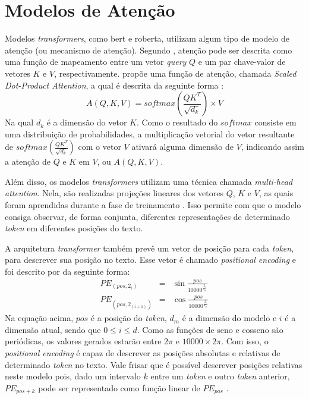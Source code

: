 \section{Modelos de Atenção}
Modelos \textit{transformers}, como \gls{bert} e \gls{roberta}, utilizam algum tipo de modelo de atenção (ou mecanismo de atenção). Segundo \textcite{Vaswani2017AttentionIA}, atenção pode ser descrita como uma função de mapeamento entre um vetor \textit{query} $Q$ e um par chave-valor de vetores $K$ e $V$, respectivamente. \textcite{Vaswani2017AttentionIA} propõe uma função de atenção, chamada \textit{Scaled Dot-Product Attention}, a qual é descrita da seguinte forma \cite{Vaswani2017AttentionIA}:
\begin{equation*}
A(Q, K, V)= softmax(\frac{QK^T}{\sqrt{d_k}}) \times V
\label{eq:attention-equation}
\end{equation*}
Na qual $d_k$ é a dimensão do vetor $K$. Como o resultado do $softmax$ consiste em uma distribuição de probabilidades, a multiplicação vetorial do vetor resultante de $softmax(\frac{QK^T}{\sqrt{d_k}})$ com o vetor $V$ ativará alguma dimensão de $V$, indicando assim a atenção de $Q$ e $K$ em $V$, ou $A(Q, K, V)$.

Além disso, os modelos \textit{transformers} utilizam uma técnica chamada \textit{multi-head attention}. Nela, são realizadas projeções lineares dos vetores $Q$, $K$ e $V$, as quais foram aprendidas durante a fase de treinamento \cite{Vaswani2017AttentionIA}. Isso permite com que o modelo consiga observar, de forma conjunta, diferentes representações de determinado \textit{token} em diferentes posições do texto.

A arquitetura \textit{transformer} também prevê um vetor de posição para cada \textit{token}, para descrever sua posição no texto. Esse vetor é chamado \textit{positional encoding} e foi descrito por \textcite{Vaswani2017AttentionIA} da seguinte forma:
\begin{eqnarray*}
PE_{(pos, 2_i)} & = &\sin{\frac{pos}{10000^\frac{2_i}{d_m}}} \\
PE_{(pos, 2_(i+1))} & = & \cos{\frac{pos}{10000^\frac{2_i}{d_m}}}
\end{eqnarray*}
Na equação acima, $pos$ é a posição do \textit{token}, $d_m$ é a dimensão do modelo e $i$ é a dimensão atual, sendo que $0 \leq i \leq d$. Como as funções de seno e cosseno são periódicas, os valores gerados estarão entre $2\pi$ e $10000 \times 2\pi$. Com isso, o \textit{positional encoding} é capaz de descrever as posições absolutas e relativas de determinado \textit{token} no texto. Vale frisar que é possível descrever posições relativas neste modelo pois, dado um intervalo $k$ entre um \textit{token} e outro \textit{token} anterior, $PE_{pos+k}$ pode ser representado como função linear de $PE_{pos}$ \cite{Vaswani2017AttentionIA}.

